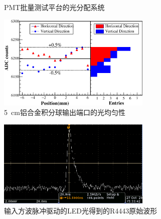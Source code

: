\begin{figure}[htbp]
	\centering
	\caption{PMT批量测试平台的光分配系统}
	\label{fig:pmt_test:light_distribution}
\end{figure}

\begin{figure}[htbp]
	\centering
	\includegraphics[width=0.65\textwidth]{chap/pmt_test/fig/integrationsphere_uniformity.eps}
	\caption{\SI{5}{cm}铝合金积分球输出端口的光均匀性}
	\label{fig:pmt_test:integrationsphere_uniformity}
\end{figure}

\begin{figure}[htbp]
	\centering
	\includegraphics[width=0.65\textwidth]{chap/pmt_test/fig/led_pulse.jpg}
	\caption{输入方波脉冲驱动的LED光得到的R4443原始波形}
	\label{fig:pmt_test:led_pulse}
\end{figure}

